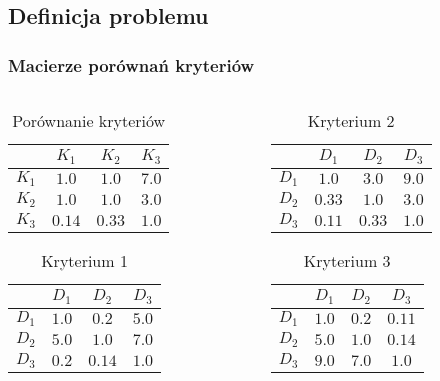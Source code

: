 \documentclass{beamer}
\begin{document}
\subsection{Definicja problemu}
\begin{frame}
\frametitle{Macierze porównań kryteriów}
	\begin{columns}
		\begin{column}{0.5\textwidth}
			\begin{table}
			\caption{Porównanie kryteriów}
				\begin{tabular}{c|c|c|c}
					&	$K_1$	&	$K_2$	&	$K_3$\\ \hline
				$K_1$	&	$1.0$	&	$1.0$	&	$7.0$\\ \hline
				$K_2$	&	$1.0$	&	$1.0$	&	$3.0$\\ \hline
				$K_3$	&	$0.14$	&	$0.33$	&	$1.0$
				\end{tabular}
			\end{table}
			\begin{table}
			\caption{Kryterium 1}
				\begin{tabular}{c|c|c|c}
					&	$D_1$	&	$D_2$	&	$D_3$\\ \hline
				$D_1$	&	$1.0$	&	$0.2$	&	$5.0$\\ \hline
				$D_2$	&	$5.0$	&	$1.0$	&	$7.0$\\ \hline
				$D_3$	&	$0.2$	&	$0.14$	&	$1.0$
				\end{tabular}
			\end{table}
		\end{column}
		\begin{column}{0.5\textwidth}
			\begin{table}
			\caption{Kryterium 2}
				\begin{tabular}{c|c|c|c}
					&	$D_1$	&	$D_2$	&	$D_3$\\ \hline
				$D_1$	&	$1.0$	&	$3.0$	&	$9.0$\\ \hline
				$D_2$	&	$0.33$	&	$1.0$	&	$3.0$\\ \hline
				$D_3$	&	$0.11$	&	$0.33$	&	$1.0$
				\end{tabular}
			\end{table}
			\begin{table}
			\caption{Kryterium 3}
				\begin{tabular}{c|c|c|c}
					&	$D_1$	&	$D_2$	&	$D_3$\\ \hline
				$D_1$	&	$1.0$	&	$0.2$	&	$0.11$\\ \hline
				$D_2$	&	$5.0$	&	$1.0$	&	$0.14$\\ \hline
				$D_3$	&	$9.0$	&	$7.0$	&	$1.0$
				\end{tabular}
			\end{table}
		\end{column}
	\end{columns}
\end{frame}
\end{document}
